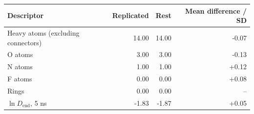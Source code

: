 \begin{tabular}{lrrr}
\toprule
Descriptor & Replicated & Rest & Mean difference / SD \\
\midrule
Heavy atoms (excluding connectors) & 14.00 & 14.00 & -0.07 \\
O atoms & 3.00 & 3.00 & -0.13 \\
N atoms & 1.00 & 1.00 & +0.12 \\
F atoms & 0.00 & 0.00 & +0.08 \\
Rings & 0.00 & 0.00 & -- \\
$\ln D_{\mathrm{end}}$, 5 ns & -1.83 & -1.87 & +0.05 \\
\bottomrule
\end{tabular}
